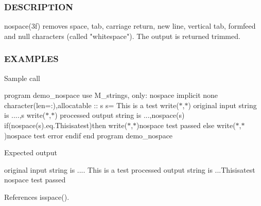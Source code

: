 \subsubsection*{D\+E\+S\+C\+R\+I\+P\+T\+I\+ON}

\begin{DoxyVerb}nospace(3f) removes space, tab, carriage return, new line, vertical
tab, formfeed and null characters (called "whitespace"). The output
is returned trimmed.
\end{DoxyVerb}


\subsubsection*{E\+X\+A\+M\+P\+L\+ES}

Sample call

program demo\+\_\+nospace use M\+\_\+strings, only\+: nospace implicit none character(len=\+:),allocatable \+:\+: s s=\textquotesingle{} This is a test \textquotesingle{} write($\ast$,$\ast$) \textquotesingle{}original input string is ....\textquotesingle{},s write($\ast$,$\ast$) \textquotesingle{}processed output string is ...\textquotesingle{},nospace(s) if(nospace(s).eq.\textquotesingle{}Thisisatest\textquotesingle{})then write($\ast$,$\ast$)\textquotesingle{}nospace test passed\textquotesingle{} else write($\ast$,$\ast$)\textquotesingle{}nospace test error\textquotesingle{} endif end program demo\+\_\+nospace

Expected output

original input string is .... This is a test processed output string is ...Thisisatest nospace test passed 

References isspace().

